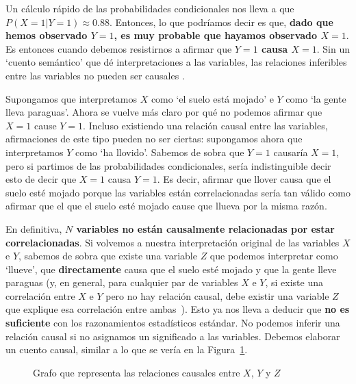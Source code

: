 \documentclass[a4paper,11pt,spanish, twoside]{tfg-uam-matematicas_25-26}
\theoremstyle{definition}
\begin{document}
Un cálculo rápido de las probabilidades condicionales nos lleva a que $P(X=1|Y=1) \approx 0.88$. Entonces, lo que podríamos decir es que, \textbf{dado que hemos observado $Y = 1$, es muy probable que hayamos observado $X=1$}. Es entonces cuando debemos resistirnos a afirmar que \textbf{$Y=1$ causa $X=1$}. Sin un `cuento semántico' que dé interpretaciones a las variables, las relaciones inferibles entre las variables no pueden ser causales \cite{DBLP:journals/corr/HuangV12}.

Supongamos que interpretamos $X$ como `el suelo está mojado' e $Y$ como `la gente lleva paraguas'. Ahora se vuelve más claro por qué no podemos afirmar que $X = 1$ cause $Y = 1$. Incluso existiendo una relación causal entre las variables, afirmaciones de este tipo pueden no ser ciertas: supongamos ahora que interpretamos $Y$ como `ha llovido'. Sabemos de sobra que $Y = 1$ causaría $X = 1$, pero si partimos de las probabilidades condicionales, sería indistinguible decir esto de decir que $X = 1$ causa $Y = 1$. Es decir, afirmar que llover causa que el suelo esté mojado porque las variables están correlacionadas sería tan válido como afirmar que el que el suelo esté mojado cause que llueva por la misma razón.

En definitiva, \textbf{$N$ variables no están causalmente relacionadas por estar correlacionadas}. Si volvemos a nuestra interpretación original de las variables $X$ e $Y$, sabemos de sobra que existe una variable $Z$ que podemos interpretar como `llueve', que \textbf{directamente} causa que el suelo esté mojado y que la gente lleve paraguas (y, en general, para cualquier par de variables $X$ e $Y$, si existe una correlación entre $X$ e $Y$ pero no hay relación causal, debe existir una variable $Z$ que explique esa correlación entre ambas~\cite{Reichenbach1956}). Esto ya nos lleva a deducir que \textbf{no es suficiente} con los razonamientos estadísticos estándar. No podemos inferir una relación causal si no asignamos un significado a las variables. Debemos elaborar un cuento causal, similar a lo que se vería en la Figura~\ref{fig:dag_causal}.

\begin{figure}[h]
\centering
{}
\caption{Grafo que representa las relaciones causales entre $X$, $Y$ y $Z$}
\label{fig:dag_causal}
\end{figure}
\end{document}
